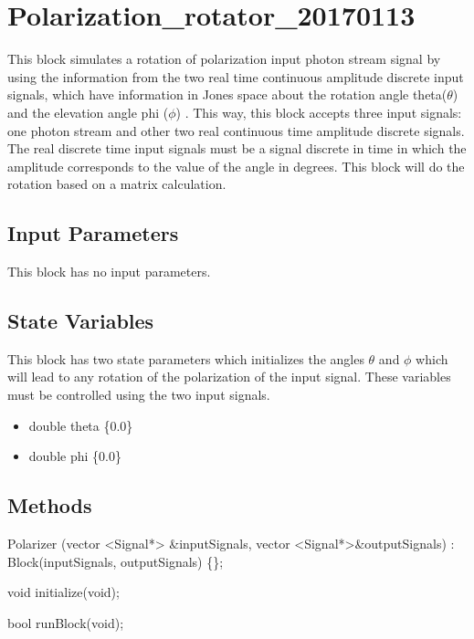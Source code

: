 \clearpage

\section{Polarization\_rotator\_20170113}

\maketitle
This block simulates a rotation of polarization input photon stream signal by using the information from the two real time continuous amplitude discrete input signals, which have information in Jones space about the rotation angle theta($\theta$) and the elevation angle phi ($\phi$) . This way, this block accepts three input signals: one photon stream and other two real continuous time amplitude discrete signals. The real discrete time input signals must be a signal discrete in time in which the amplitude corresponds to the value of the angle in degrees. This block will do the rotation based on a matrix calculation.

\subsection*{Input Parameters}
 This block has no input parameters.

\subsection*{State Variables}
 This block has two state parameters which initializes the angles $\theta$ and $\phi$ which will lead to any rotation of the polarization of the input signal. These variables must be controlled using the two input signals.
	\begin{itemize}
		\item double theta \{0.0\}
		\item double phi \{0.0\}
	\end{itemize}

\subsection*{Methods}

Polarizer (vector <Signal*> \&inputSignals, vector <Signal*>\&outputSignals) : Block(inputSignals, outputSignals) \{\};

void initialize(void);

bool runBlock(void);


